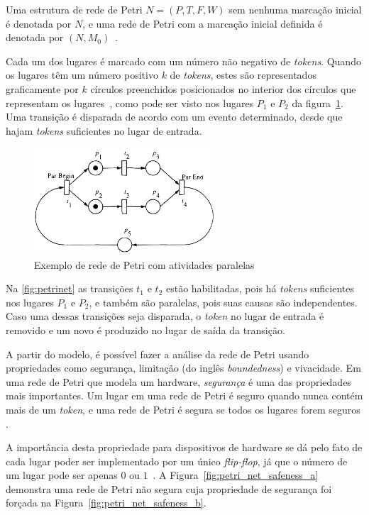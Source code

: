 Uma estrutura de rede de Petri \(N=(P,T,F,W)\) sem nenhuma marcação inicial é denotada por \(N\), e uma rede de Petri com a marcação inicial definida é denotada por \((N,M_0)\)~\cite{murata:1989}.

Cada um dos lugares é marcado com um número não negativo de \textit{tokens}. Quando os lugares têm um número positivo \(k\) de \textit{tokens}, estes são representados graficamente por \(k\) círculos preenchidos posicionados no interior dos círculos que representam os lugares~\cite{murata:1989}, como pode ser visto nos lugares \(P_1\) e \(P_2\) da figura~\ref{fig:petrinet}. Uma transição é disparada de acordo com um evento determinado, desde que hajam \textit{tokens} suficientes no lugar de entrada.

\begin{figure}[ht]
	\caption{\label{fig:petrinet}Exemplo de rede de Petri com atividades paralelas}
	\begin{center}
	    \includegraphics[width=0.6\textwidth]{resources/petri_net_murata_1}
	\end{center}
\end{figure}

Na \autoref{fig:petrinet} as transições $t_1$ e $t_2$ estão habilitadas, pois há \textit{tokens} suficientes nos lugares $P_1$ e $P_2$, e também são paralelas, pois suas causas são independentes. Caso uma dessas transições seja disparada, o \textit{token} no lugar de entrada é removido e um novo é produzido no lugar de saída da transição.

A partir do modelo, é possível fazer a análise da rede de Petri usando propriedades como segurança, limitação (do inglês \textit{boundedness}) e vivacidade. Em uma rede de Petri que modela um hardware, \textit{segurança} é uma das propriedades mais importantes. Um lugar em uma rede de Petri é seguro quando nunca contém mais de um \textit{token}, e uma rede de Petri é segura se todos os lugares forem seguros \cite{peterson:1981}.

A importância desta propriedade para dispositivos de hardware se dá pelo fato de cada lugar poder ser implementado por um único \textit{flip-flop}, já que o número de um lugar pode ser apenas $0$ ou $1$~\cite{peterson:1981}. A Figura~\ref{fig:petri_net_safeness_a} demonstra uma rede de Petri não segura cuja propriedade de segurança foi forçada na Figura~\ref{fig:petri_net_safeness_b}.

